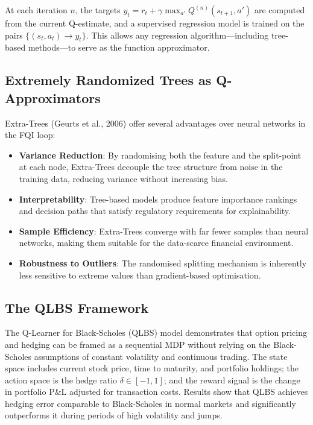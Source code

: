 \documentclass[conference]{IEEEtran}
\begin{document}
At each iteration $n$, the targets $y_t = r_t + \gamma \max_{a'} Q^{(n)}(s_{t+1}, a')$ are computed from the current Q-estimate, and a supervised regression model is trained on the pairs $\{(s_t, a_t) \to y_t\}$. This allows any regression algorithm---including tree-based methods---to serve as the function approximator.

\subsection{Extremely Randomized Trees as Q-Approximators}
Extra-Trees (Geurts et al., 2006) offer several advantages over neural networks in the FQI loop:
\begin{itemize}[nosep]
    \item \textbf{Variance Reduction}: By randomising both the feature and the split-point at each node, Extra-Trees decouple the tree structure from noise in the training data, reducing variance without increasing bias.
    \item \textbf{Interpretability}: Tree-based models produce feature importance rankings and decision paths that satisfy regulatory requirements for explainability.
    \item \textbf{Sample Efficiency}: Extra-Trees converge with far fewer samples than neural networks, making them suitable for the data-scarce financial environment.
    \item \textbf{Robustness to Outliers}: The randomised splitting mechanism is inherently less sensitive to extreme values than gradient-based optimisation.
\end{itemize}

\subsection{The QLBS Framework}
The Q-Learner for Black-Scholes (QLBS) model demonstrates that option pricing and hedging can be framed as a sequential MDP without relying on the Black-Scholes assumptions of constant volatility and continuous trading. The state space includes current stock price, time to maturity, and portfolio holdings; the action space is the hedge ratio $\delta \in [-1, 1]$; and the reward signal is the change in portfolio P\&L adjusted for transaction costs. Results show that QLBS achieves hedging error comparable to Black-Scholes in normal markets and significantly outperforms it during periods of high volatility and jumps.

\end{document}
